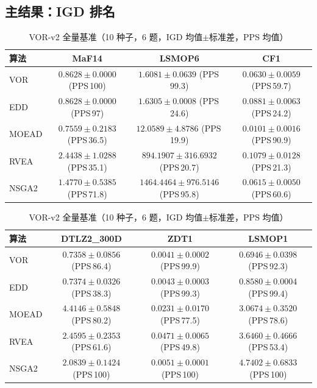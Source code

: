 \documentclass[a4paper,11pt]{article}
\begin{document}
\subsection{主结果：IGD 排名}
\label{sec:results}
\begin{table}[h]
\centering
\caption{VOR-v2 全量基准（10 种子，6 题，IGD 均值$\pm$标准差，PPS 均值）}
\label{tab:main}
\begin{tabular}{lccc}
\toprule
\textbf{算法} & \textbf{MaF14} & \textbf{LSMOP6} & \textbf{CF1}\\
\midrule
VOR & $0.8628\pm0.0000$ (PPS\,100) & $1.6081\pm0.0639$ (PPS\,99.3) & $0.0630\pm0.0059$ (PPS\,59.7)\\
EDD & $0.8628\pm0.0000$ (PPS\,97) & $1.6305\pm0.0008$ (PPS\,24.6) & $0.0881\pm0.0063$ (PPS\,24.2)\\
MOEAD & $0.7559\pm0.2183$ (PPS\,36.5) & $12.0589\pm4.8786$ (PPS\,19.9) & $0.0101\pm0.0016$ (PPS\,90.9)\\
RVEA & $2.4438\pm1.0288$ (PPS\,35.1) & $894.1907\pm316.6932$ (PPS\,20.7) & $0.1079\pm0.0128$ (PPS\,21.3)\\
NSGA2 & $1.4770\pm0.5385$ (PPS\,71.8) & $1464.4464\pm976.5146$ (PPS\,95.8) & $0.0615\pm0.0050$ (PPS\,60.6)\\
\bottomrule
\end{tabular}
\vspace{2pt}
\begin{tabular}{lccc}
\midrule
\textbf{算法} & \textbf{DTLZ2\_300D} & \textbf{ZDT1} & \textbf{LSMOP1}\\
\midrule
VOR & $0.7358\pm0.0856$ (PPS\,86.4) & $0.0041\pm0.0002$ (PPS\,99.9) & $0.6946\pm0.0398$ (PPS\,92.3)\\
EDD & $0.7374\pm0.0326$ (PPS\,38.3) & $0.0043\pm0.0003$ (PPS\,99.3) & $0.8580\pm0.0004$ (PPS\,99.4)\\
MOEAD & $4.4146\pm0.5848$ (PPS\,80.2) & $0.0231\pm0.0170$ (PPS\,77.5) & $3.0674\pm0.3520$ (PPS\,78.6)\\
RVEA & $2.4595\pm0.2353$ (PPS\,61.6) & $0.0471\pm0.0065$ (PPS\,49.8) & $3.6460\pm0.4666$ (PPS\,53.4)\\
NSGA2 & $2.0839\pm0.1424$ (PPS\,100) & $0.0051\pm0.0001$ (PPS\,100) & $4.7402\pm0.6833$ (PPS\,100)\\
\bottomrule
\end{tabular}
\end{table}
\end{document}
